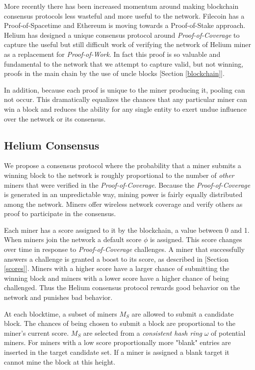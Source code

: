 \documentclass[10pt, nonatbib, nocopyrightspace, reprint]{sigplanconf}
\begin{document}
More recently there has been increased momentum around making blockchain consensus protocols less wasteful and more useful to the network. Filecoin \cite{filecoin} has a Proof-of-Spacetime and Ethereum \cite{ethereum} is moving towards a Proof-of-Stake approach. Helium has designed a unique consensus protocol around \emph{Proof-of-Coverage} to capture the useful but still difficult work of verifying the network of Helium miner as a replacement for \emph{Proof-of-Work}. In fact this proof is so valuable and fundamental to the network that we attempt to capture valid, but not winning, proofs in the main chain by the use of uncle blocks [Section \ref{blockchain}].

In addition, because each proof is unique to the miner producing it, pooling can not occur. This dramatically equalizes the chances that any particular miner can win a block and reduces the ability for any single entity to exert undue influence over the network or its consensus.

\subsection{Helium Consensus}

We propose a consensus protocol where the probability that a miner submits a winning block to the network is roughly proportional to the number of \emph{other} miners that were verified in the \emph{Proof-of-Coverage}. Because the \emph{Proof-of-Coverage} is generated in an unpredictable way, mining power is fairly equally distributed among the network. Miners offer wireless network coverage and verify others as proof to participate in the consensus.

Each miner has a score assigned to it by the blockchain, a value between 0 and 1. When miners join the network a default score $\phi$ is assigned. This score changes over time in response to \emph{Proof-of-Coverage} challenges. A miner that successfully answers a challenge is granted a boost to its score, as described in [Section \ref{scores}]. Miners with a higher score have a larger chance of submitting the winning block and miners with a lower score have a higher chance of being challenged. Thus the Helium consensus protocol rewards good behavior on the network and punishes bad behavior.

At each blocktime, a subset of miners $M_S$ are allowed to submit a candidate block. The chances of being chosen to submit a block are proportional to the miner's current score. $M_S$ are selected from a \emph{consistent hash ring} $\omega$ of potential miners. For miners with a low score proportionally more "blank" entries are inserted in the target candidate set. If a miner is assigned a blank target it cannot mine the block at this height.
\end{document}
